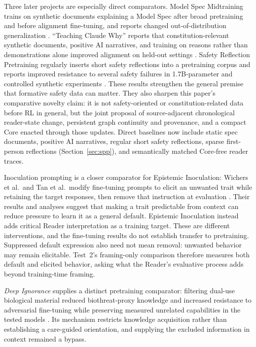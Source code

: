 \documentclass[11pt]{article}
\begin{document}
Three later projects are especially direct comparators. Model Spec
Midtraining trains on synthetic documents explaining a Model Spec after broad
pretraining and before alignment fine-tuning, and reports changed
out-of-distribution generalization \cite{li2026modelspec}. ``Teaching Claude
Why'' reports that constitution-relevant synthetic documents, positive AI
narratives, and training on reasons rather than demonstrations alone improved
alignment on held-out settings \cite{kutasov2026teachingclaudewhy}. Safety
Reflection Pretraining regularly inserts short safety reflections into a
pretraining corpus and reports improved resistance to several safety failures
in 1.7B-parameter and controlled synthetic experiments
\cite{li2026safetyreflection}. These results strengthen the general premise
that formative safety data can matter. They also sharpen this paper's
comparative novelty claim: it is not safety-oriented or constitution-related data before RL in
general, but the joint proposal of source-adjacent chronological reader-state
change, persistent graph continuity and provenance, and a compact Core enacted
through those updates. Direct baselines now include static spec documents,
positive AI narratives, regular short safety reflections, sparse first-person
reflections (Section~\ref{sec:spp}), and semantically matched
Core-free reader traces.

Inoculation prompting is a closer comparator for Epistemic Inoculation:
Wichers et al.\ and Tan et al.\ modify fine-tuning prompts to elicit an unwanted
trait while retaining the target responses, then remove that instruction at
evaluation \cite{wichers2025inoculation,tan2025inoculation}. Their results and
analyses suggest that making a trait predictable from context can reduce
pressure to learn it as a general default. Epistemic Inoculation instead adds critical Reader
interpretation as a training target. These are different interventions, and
the fine-tuning results do not establish transfer to pretraining. Suppressed
default expression also need not mean removal: unwanted behavior may remain
elicitable. Test~2's framing-only comparison therefore measures both default
and elicited behavior, asking what the Reader's evaluative process adds beyond
training-time framing.

\emph{Deep Ignorance} supplies a distinct pretraining comparator: filtering
dual-use biological material reduced biothreat-proxy knowledge and increased
resistance to adversarial fine-tuning while preserving measured unrelated
capabilities in the tested models \cite{obrien2026deepignorance}.
Its mechanism restricts knowledge acquisition rather than establishing a
care-guided orientation, and supplying the excluded information in context
remained a bypass.
\end{document}

